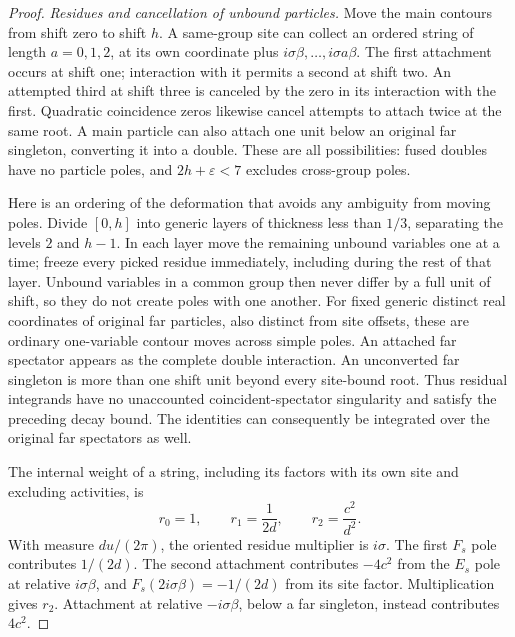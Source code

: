 \begin{proof}
\emph{Residues and cancellation of unbound particles.}
Move the main contours from shift zero to shift $h$. A same-group
site can collect an ordered string of length $a=0,1,2$, at its own
coordinate plus $i\sigma\beta,\ldots,i\sigma a\beta$.
The first attachment occurs at shift one; interaction with it permits
a second at shift two. An attempted third at shift three is canceled
by the zero in its interaction with the first. Quadratic coincidence
zeros likewise cancel attempts to attach twice at the same root.
A main particle can also attach one unit below an original far
singleton, converting it into a double. These are all possibilities:
fused doubles have no particle poles, and $2h+\varepsilon<7$
excludes cross-group poles.

Here is an ordering of the deformation that avoids any ambiguity
from moving poles. Divide $[0,h]$ into generic layers of thickness
less than $1/3$, separating the levels $2$ and $h-1$. In each layer
move the remaining unbound variables one at a time; freeze every
picked residue immediately, including during the rest of that layer.
Unbound variables in a common group then never differ by a full unit
of shift, so they do not create poles with one another. For fixed
generic distinct real coordinates of original far particles, also
distinct from site offsets, these are ordinary one-variable contour
moves across simple poles. An attached far spectator appears as the
complete double interaction. An unconverted far singleton is more
than one shift unit beyond every site-bound root. Thus residual
integrands have no unaccounted coincident-spectator singularity and
satisfy the preceding decay bound. The identities can consequently
be integrated over the original far spectators as well.

The internal weight of a string, including its factors with its own
site and excluding activities, is
\begin{equation}\label{eq:02-string-residues}
 r_0=1,\qquad r_1=\frac1{2d},\qquad r_2=\frac{c^2}{d^2}.
\end{equation}
With measure $du/(2\pi)$, the oriented residue multiplier is
$i\sigma$. The first $F_s$ pole contributes $1/(2d)$. The second
attachment contributes $-4c^2$ from the $E_s$ pole at relative
$i\sigma\beta$, and $F_s(2i\sigma\beta)=-1/(2d)$ from its
site factor. Multiplication gives $r_2$. Attachment at relative
$-i\sigma\beta$, below a far singleton, instead contributes
$4c^2$.


\end{proof}
